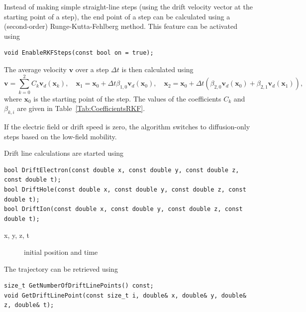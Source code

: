 Instead of making simple straight-line steps (using the drift velocity 
vector at the starting point of a step), the end point of a step 
can be calculated using a (second-order) Runge-Kutta-Fehlberg method. 
This feature can be activated using
\begin{lstlisting}
void EnableRKFSteps(const bool on = true); 
\end{lstlisting}
The average velocity $\mathbf{v}$ over a step $\Delta{t}$ is then 
calculated using
\begin{equation*}
\mathbf{v} = \sum\limits_{k=0}^{2}C_{k}\mathbf{v}_{d}\left(\mathbf{x}_{k}\right), \quad 
\mathbf{x}_{1} = \mathbf{x}_{0} + \Delta{t}\beta_{1,0}\mathbf{v}_{d}\left(\mathbf{x}_{0}\right), \quad 
\mathbf{x}_{2} = \mathbf{x}_{0} + \Delta{t}\left(\beta_{2,0}\mathbf{v}_{d}\left(\mathbf{x}_{0}\right) + \beta_{2,1}\mathbf{v}_{d}\left(\mathbf{x}_{1}\right)\right),
\end{equation*}
where $\mathbf{x}_{0}$ is the starting point of the step. The values of the 
coefficients $C_{k}$ and $\beta_{k,i}$ are given in 
Table~\ref{Tab:CoefficientsRKF}.

If the electric field or drift speed is zero, the algorithm switches 
to diffusion-only steps based on the low-field mobility.

Drift line calculations are started using 
\begin{lstlisting}
bool DriftElectron(const double x, const double y, const double z, const double t);
bool DriftHole(const double x, const double y, const double z, const double t);
bool DriftIon(const double x, const double y, const double z, const double t);
\end{lstlisting}
\begin{description}
  \item[x, y, z, t] initial position and time
\end{description}
The trajectory can be retrieved using
\begin{lstlisting} 
size_t GetNumberOfDriftLinePoints() const;
void GetDriftLinePoint(const size_t i, double& x, double& y, double& z, double& t);
\end{lstlisting}

